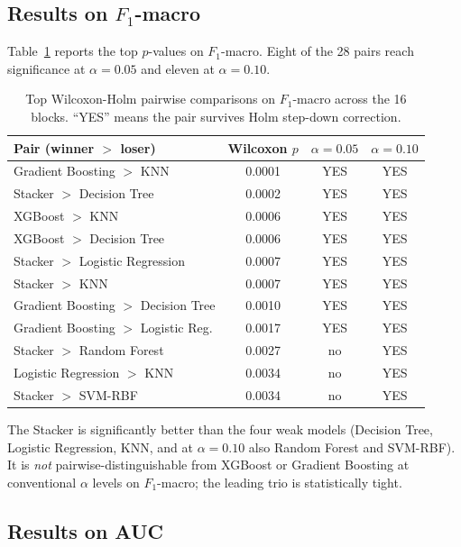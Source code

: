\subsection{Results on $F_{1}$-macro}

Table~\ref{tab:holm-f1} reports the top $p$-values on $F_1$-macro.
Eight of the 28 pairs reach significance at $\alpha=0.05$ and
eleven at $\alpha=0.10$.

\begin{table}[H]
\centering
\caption{Top Wilcoxon-Holm pairwise comparisons on $F_1$-macro
across the 16 blocks. ``YES'' means the pair survives Holm
step-down correction.}
\singlespacing
\label{tab:holm-f1}
\small
\renewcommand{\arraystretch}{1.15}
\begin{tabular}{l c c c}
\toprule
\textbf{Pair (winner $>$ loser)} & \textbf{Wilcoxon $p$} & \textbf{$\alpha=0.05$} & \textbf{$\alpha=0.10$}\\
\midrule
Gradient Boosting $>$ KNN & 0.0001 & YES & YES\\
Stacker $>$ Decision Tree & 0.0002 & YES & YES\\
XGBoost $>$ KNN & 0.0006 & YES & YES\\
XGBoost $>$ Decision Tree & 0.0006 & YES & YES\\
Stacker $>$ Logistic Regression & 0.0007 & YES & YES\\
Stacker $>$ KNN & 0.0007 & YES & YES\\
Gradient Boosting $>$ Decision Tree& 0.0010 & YES & YES\\
Gradient Boosting $>$ Logistic Reg.& 0.0017 & YES & YES\\
Stacker $>$ Random Forest & 0.0027 & no & YES\\
Logistic Regression $>$ KNN & 0.0034 & no & YES\\
Stacker $>$ SVM-RBF & 0.0034 & no & YES\\
\bottomrule
\end{tabular}
\end{table}
The Stacker is significantly better than the four weak models
(Decision Tree, Logistic Regression, KNN, and at $\alpha=0.10$ also
Random Forest and SVM-RBF). It is \emph{not} pairwise-distinguishable
from XGBoost or Gradient Boosting at conventional $\alpha$ levels
on $F_1$-macro; the leading trio is statistically tight.

\subsection{Results on AUC}

